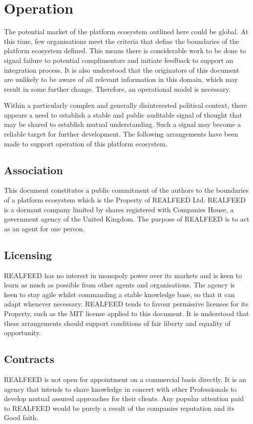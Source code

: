 \documentclass[11pt, oneside]{article}   	%
\begin{document}
\section{Operation}
The potential market of the platform ecosystem outlined here could be global.
At this time, few organisations meet the criteria that define the boundaries of the platform ecosystem defined.
This means there is considerable work to be done to signal failure to potential complimentors and initiate feedback to support an integration process.
It is also understood that the originators of this document are unlikely to be aware of all relevant information in this domain, which may result in some further change.
Therefore, an operational model is necessary.\

Within a particularly complex and generally disinterested political context, there appears a need to establish a stable and public auditable signal of thought that may be shared to establish mutual understanding.
Such a signal may become a reliable target for further development.
The following arrangements have been made to support operation of this platform ecosystem.\

\subsection{Association}
This document constitutes a public commitment of the authors to the boundaries of a platform ecosystem which is the Property of REALFEED Ltd.
REALFEED is a dormant company limited by shares registered with Companies House, a government agency of the United Kingdom.
The purpose of REALFEED is to act as an agent for one person.

\subsection{Licensing}
REALFEED has no interest in monopoly power over its markets and is keen to learn as much as possible from other agents and organisations.
The agency is keen to stay agile whilst commanding a stable knowledge base, so that it can adapt whenever necessary.
REALFEED tends to favour permissive licenses for its Property, such as the MIT license applied to this document.
It is understood that these arrangements should support conditions of fair liberty and equality of opportunity. 

\subsection{Contracts}
REALFEED is not open for appointment on a commercial basis directly.
It is an agency that intends to share knowledge in concert with other Professionals to develop mutual assured approaches for their clients.
Any popular attention paid to REALFEED would be purely a result of the companies reputation and its Good faith.
\end{document}
